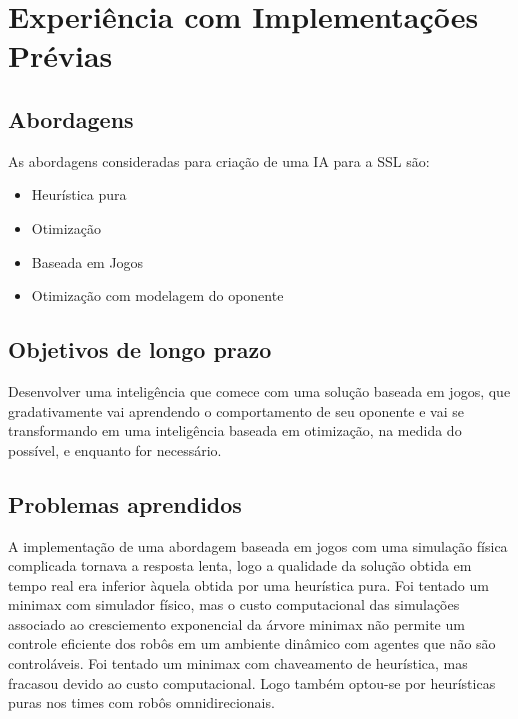 \chapter{Experiência com Implementações Prévias}\label{cap:licoes_aprendidas}

\section{Abordagens}

As abordagens consideradas para criação de uma IA para a SSL são:
\begin{itemize}
 \item Heurística pura
 \item Otimização
 \item Baseada em Jogos
 \item Otimização com modelagem do oponente
\end{itemize}

\section{Objetivos de longo prazo}
Desenvolver uma inteligência que comece com uma solução baseada em jogos, que
gradativamente vai aprendendo o comportamento de seu oponente e vai se
transformando em uma inteligência baseada em otimização, na medida do possível, e
enquanto for necessário.

\section{Problemas aprendidos}
A implementação de uma abordagem baseada em jogos com uma simulação física complicada
tornava a resposta lenta, logo a qualidade da solução obtida em tempo real era inferior
àquela obtida por uma heurística pura.
Foi tentado um minimax com simulador físico, mas o custo computacional das simulações
associado ao cresciemento exponencial da árvore minimax não permite um controle eficiente
dos robôs em um ambiente dinâmico com agentes que não são controláveis.
Foi tentado um minimax com chaveamento de heurística, mas fracasou devido ao
custo computacional. Logo também optou-se por heurísticas puras nos
times com robôs omnidirecionais.

